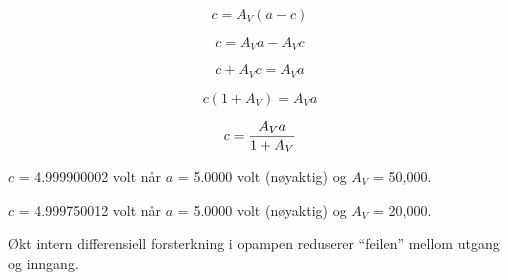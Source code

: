 





$$c = A_V (a - c)$$

$$c = A_V a - A_V c$$

$$c + A_V c = A_V a$$

$$c (1 + A_V) = A_V a$$

$$c = {A_V a \over {1 + A_V}}$$

$c$ = 4.999900002 volt når $a$ = 5.0000 volt (nøyaktig) og $A_V$ = 50,000.

$c$ = 4.999750012 volt når $a$ = 5.0000 volt (nøyaktig) og $A_V$ = 20,000.

\vskip 10pt

Økt intern differensiell forsterkning i opampen reduserer ``feilen'' mellom utgang og inngang.










